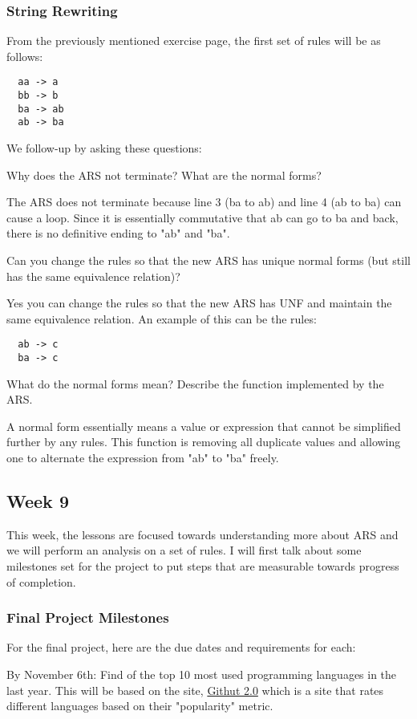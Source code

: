 \documentclass{article}
\theoremstyle{theorem}
\theoremstyle{definition}
\theoremstyle{remark}
\begin{document}
\subsubsection{String Rewriting}
From the previously mentioned exercise page, the first set of rules will be as follows:
\begin{lstlisting}
  aa -> a
  bb -> b
  ba -> ab
  ab -> ba
\end{lstlisting}
We follow-up by asking these questions:

\medskip
Why does the ARS not terminate?
What are the normal forms?

\medskip
The ARS does not terminate because line 3 (ba to ab) and line 4 (ab to ba) can cause a loop. Since it is essentially commutative that ab can go to ba and back, there is no definitive ending to "ab" and "ba".

\medskip
Can you change the rules so that the new ARS has unique normal forms (but still has the same equivalence relation)?

\medskip
Yes you can change the rules so that the new ARS has UNF and maintain the same equivalence relation. An example of this can be the rules:
\begin{lstlisting}
  ab -> c
  ba -> c
\end{lstlisting}

\medskip
What do the normal forms mean? Describe the function implemented by the ARS.

\medskip
A normal form essentially means a value or expression that cannot be simplified further by any rules. This function is removing all duplicate values and allowing one to alternate the expression from "ab" to "ba" freely. 

\subsection{Week 9} This week, the lessons are focused towards understanding more about ARS and we will perform an analysis on a set of rules. I will first talk about some milestones set for the project to put steps that are measurable towards progress of completion.

\subsubsection{Final Project Milestones}
For the final project, here are the due dates and requirements for each:

\medskip
By November 6th: Find of the top 10 most used programming languages in the last year. This will be based on the site, \href{https://madnight.github.io/githut/#/pull_requests/2021/4}{Githut 2.0} which is a site that rates different languages based on their "popularity" metric.
\end{document}
